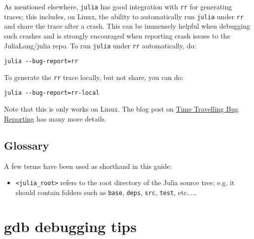 As mentioned elsewhere, \texttt{julia} has good integration with \texttt{rr} for generating traces; this includes, on Linux, the ability to automatically run \texttt{julia} under \texttt{rr} and share the trace after a crash. This can be immensely helpful when debugging such crashes and is strongly encouraged when reporting crash issues to the JuliaLang/julia repo. To run \texttt{julia} under \texttt{rr} automatically, do:




\begin{verbatim}
julia --bug-report=rr
\end{verbatim}



To generate the \texttt{rr} trace locally, but not share, you can do:




\begin{verbatim}
julia --bug-report=rr-local
\end{verbatim}



Note that this is only works on Linux. The blog post on \href{https://julialang.org/blog/2020/05/rr/}{Time Travelling Bug Reporting} has many more details.



\hypertarget{15861385441225766089}{}


\subsection{Glossary}



A few terms have been used as shorthand in this guide:



\begin{itemize}
\item \texttt{<julia\_root>} refers to the root directory of the Julia source tree; e.g. it should contain folders such as \texttt{base}, \texttt{deps}, \texttt{src}, \texttt{test}, etc.....

\end{itemize}


\hypertarget{9363494011247086183}{}


\section{gdb debugging tips}



